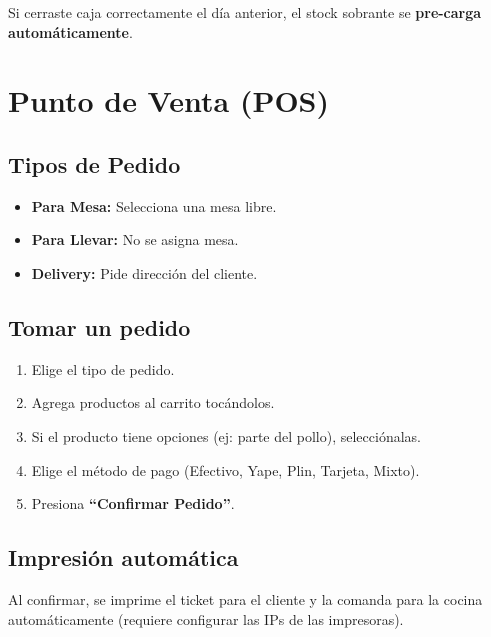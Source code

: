 \documentclass[10pt,a4paper,twoside]{article}
\begin{document}
\begin{tipbox}
Si cerraste caja correctamente el día anterior, el stock sobrante se \textbf{pre-carga automáticamente}.
\end{tipbox}

\section{Punto de Venta (POS)}

\subsection{Tipos de Pedido}
\begin{itemize}[itemsep=1pt, leftmargin=15pt]
    \item \textbf{Para Mesa:} Selecciona una mesa libre.
    \item \textbf{Para Llevar:} No se asigna mesa.
    \item \textbf{Delivery:} Pide dirección del cliente.
\end{itemize}

\subsection{Tomar un pedido}
\begin{stepbox}
\begin{enumerate}[itemsep=1pt, leftmargin=15pt]
    \item Elige el tipo de pedido.
    \item Agrega productos al carrito tocándolos.
    \item Si el producto tiene opciones (ej: parte del pollo), selecciónalas.
    \item Elige el método de pago (Efectivo, Yape, Plin, Tarjeta, Mixto).
    \item Presiona \textbf{``Confirmar Pedido''}.
\end{enumerate}
\end{stepbox}

\subsection{Impresión automática}
Al confirmar, se imprime el ticket para el cliente y la comanda para la cocina automáticamente (requiere configurar las IPs de las impresoras).

\end{document}
